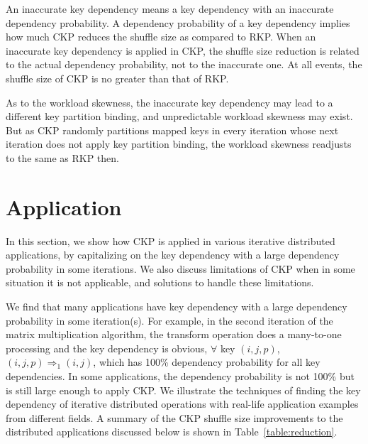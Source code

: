 \documentclass[10pt,journal,compsoc]{IEEEtran}
\begin{document}
An inaccurate key dependency means a key dependency with 
an inaccurate dependency probability. 
A dependency probability of a key dependency implies 
how much CKP reduces the shuffle size as compared to RKP.
When an inaccurate key dependency is applied
in CKP, the shuffle size reduction
is related to the actual dependency probability, not to the inaccurate one. 
At all events, the shuffle size of CKP is no greater than that of RKP. 

As to the workload skewness, the inaccurate key dependency may lead to
a different key partition binding, and unpredictable workload skewness may exist. 
But as CKP randomly partitions mapped keys in every iteration whose next iteration does not apply key partition binding, 
the workload skewness readjusts to the same as RKP then.



\section{Application}\label{section:application}
In this section, we show how CKP is applied in various
iterative distributed applications, by capitalizing on the key dependency 
with a large dependency probability in some iterations. 
We also discuss limitations of CKP when in some situation it is not
applicable, and solutions to handle these limitations.

We find that many applications have key dependency with 
a large dependency probability in some iteration(s).
For example, 
in the second iteration of the matrix multiplication algorithm, 
the transform operation does a many-to-one processing and the key dependency is obvious, 
$\forall$ key $(i,j,p)$, $(i,j,p) \Rightarrow_{1} (i,j)$,
which has 100\% dependency probability for all key dependencies.
In some applications, the dependency probability is not 100\% but 
is still large enough to apply CKP.
We illustrate the techniques of finding the key dependency of iterative
distributed operations with real-life application examples from 
different fields.
A summary of the CKP shuffle size improvements to the distributed applications discussed below is shown in Table~\ref{table:reduction}.
\end{document}

